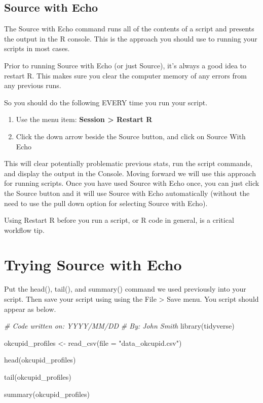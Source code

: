 \documentclass[
]{krantz}
\makeatletter
\newenvironment{Shaded}{\begin{snugshade}}{\end{snugshade}}
\newcommand{\AttributeTok}[1]{\textcolor[rgb]{0.61,0.61,0.61}{#1}}
\newcommand{\CommentTok}[1]{\textcolor[rgb]{0.37,0.37,0.37}{\textit{#1}}}
\newcommand{\FunctionTok}[1]{\textcolor[rgb]{0,0,0}{#1}}
\newcommand{\NormalTok}[1]{#1}
\newcommand{\OtherTok}[1]{\textcolor[rgb]{0.37,0.37,0.37}{#1}}
\newcommand{\StringTok}[1]{\textcolor[rgb]{0.5,0.5,0.5}{#1}}
\providecommand{\tightlist}{%
  \setlength{\itemsep}{0pt}\setlength{\parskip}{0pt}}
\newenvironment{kframe}{%
\medskip{}
\setlength{\fboxsep}{.8em}
 \def\at@end@of@kframe{}%
 \ifinner\ifhmode%
  \def\at@end@of@kframe{\end{minipage}}%
  \begin{minipage}{\columnwidth}%
 \fi\fi%
 \def\FrameCommand##1{\hskip\@totalleftmargin \hskip-\fboxsep
 \colorbox{shadecolor}{##1}\hskip-\fboxsep
     \hskip-\linewidth \hskip-\@totalleftmargin \hskip\columnwidth}%
 \MakeFramed {\advance\hsize-\width
   \@totalleftmargin\z@ \linewidth\hsize
   \@setminipage}}%
 {\par\unskip\endMakeFramed%
 \at@end@of@kframe}
\newenvironment{rmdblock}[1]
  {
  \begin{itemize}
  \renewcommand{\labelitemi}{
    \raisebox{-.7\height}[0pt][0pt]{
      {\setkeys{Gin}{width=3em,keepaspectratio}\texttt{[image: images/\#1]}}
    }
  }
  \setlength{\fboxsep}{1em}
  \begin{kframe}
  \item
  }
  {
  \end{kframe}
  \end{itemize}
  }
\newenvironment{rmdcaution}
  {\begin{rmdblock}{caution}}
  {\end{rmdblock}}
\renewenvironment{Shaded}{\begin{kframe}}{\end{kframe}}
\makeatother
\begin{document}
\hypertarget{source-with-echo}{%
\subsection{Source with Echo}\label{source-with-echo}}

The Source with Echo command runs all of the contents of a script and presents the output in the R console. This is the approach you should use to running your scripts in most cases.

Prior to running Source with Echo (or just Source), it's always a good idea to restart R. This makes sure you clear the computer memory of any errors from any previous runs.

So you should do the following EVERY time you run your script.

\begin{enumerate}
\def\labelenumi{\arabic{enumi}.}
\tightlist
\item
  Use the menu item: \textbf{Session \textgreater{} Restart R}
\item
  Click the down arrow beside the Source button, and click on Source With Echo
\end{enumerate}

This will clear potentially problematic previous stats, run the script commands, and display the output in the Console. Moving forward we will use this approach for running scripts. Once you have used Source with Echo once, you can just click the Source button and it will use Source with Echo automatically (without the need to use the pull down option for selecting Source with Echo).

\begin{rmdcaution}
Using Restart R before you run a script, or R code in general, is a critical workflow tip.
\end{rmdcaution}

\hypertarget{trying-source-with-echo}{%
\section{Trying Source with Echo}\label{trying-source-with-echo}}

Put the head(), tail(), and summary() command we used previously into your script. Then save your script using using the File \textgreater{} Save menu. You script should appear as below.

\begin{Shaded}
\begin{Highlighting}[]
\CommentTok{\# Code written on: YYYY/MM/DD }
\CommentTok{\# By: John Smith}
\FunctionTok{library}\NormalTok{(tidyverse)}

\NormalTok{okcupid\_profiles }\OtherTok{\textless{}{-}} \FunctionTok{read\_csv}\NormalTok{(}\AttributeTok{file =} \StringTok{"data\_okcupid.csv"}\NormalTok{)}

\FunctionTok{head}\NormalTok{(okcupid\_profiles)}

\FunctionTok{tail}\NormalTok{(okcupid\_profiles)}

\FunctionTok{summary}\NormalTok{(okcupid\_profiles)}
\end{Highlighting}
\end{Shaded}
\end{document}
